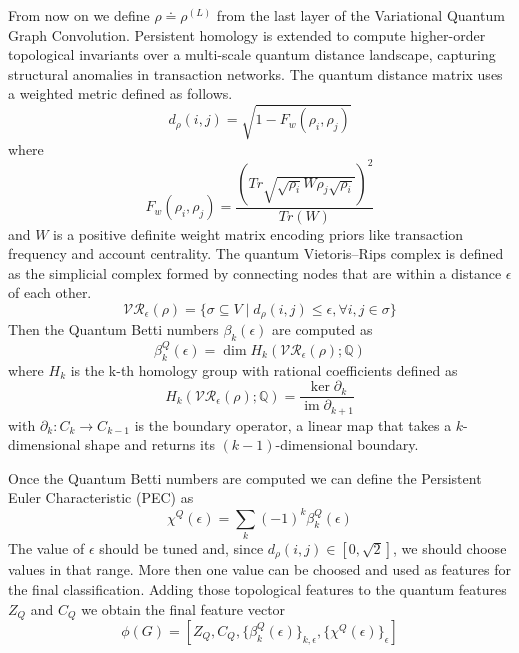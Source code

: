 From now on we define \(\rho \doteq \rho^{(L)}\) from the last layer of the Variational Quantum Graph Convolution. Persistent homology is extended to compute higher-order topological invariants over a multi-scale quantum distance landscape, capturing structural anomalies in transaction networks. The quantum distance matrix uses a weighted metric defined as follows.
\begin{equation}
    d_{\rho}(i,j)=\sqrt{1-F_{w}(\rho_{i},\rho_{j})}
\end{equation}
where
\begin{equation}
    F_{w}(\rho_{i},\rho_{j})=\frac{(Tr\sqrt{\sqrt{\rho_{i}}W\rho_{j}\sqrt{\rho_{i}}})^{2}}{Tr(W)}
\end{equation}
and \(W\) is a positive definite weight matrix encoding priors like transaction frequency and account centrality.
The quantum Vietoris--Rips complex is defined as the simplicial complex formed by connecting nodes that are within a distance $\epsilon$ of each other.
\begin{equation}
    \mathcal{VR}_{\epsilon}(\rho)=\{\sigma\subseteq V \mid d_{\rho}(i,j)\le\epsilon,\forall i,j\in\sigma\}
\end{equation}
Then the Quantum Betti numbers \(\beta_k(\epsilon)\) are computed as
\begin{equation}
    \beta_{k}^{Q}(\epsilon)=\dim H_{k}(\mathcal{V}\mathcal{R}_{\epsilon}(\rho);\mathbb{Q})
\end{equation}
where \(H_k\) is the k-th homology group with rational coefficients defined as
\begin{equation}
    H_{k}(\mathcal{VR}_{\epsilon}(\rho);\mathbb{Q})=\frac{\ker \partial_{k}}{\operatorname{im} \partial_{k+1}}
\end{equation}
with \(\partial_k : C_k \to C_{k-1}\) is the boundary operator, a linear map that takes a $k$-dimensional shape and returns its $(k-1)$-dimensional boundary.

Once the Quantum Betti numbers are computed we can define the Persistent Euler Characteristic (PEC) as
\begin{equation}
    \chi^{Q}(\epsilon)=\sum_{k}(-1)^{k}\beta_{k}^{Q}(\epsilon)
\end{equation}
The value of \(\epsilon\) should be tuned and, since \(d_\rho(i,j) \in [0,\sqrt{2}]\), we should choose values in that range. More then one value can be choosed and used as features for the final classification.
Adding those topological features to the quantum features \(Z_Q\) and \(C_Q\) we obtain the final feature vector
\begin{equation}
    \phi(G)=[Z_{Q},C_{Q},\{\beta_{k}^{Q}(\epsilon)\}_{k,\epsilon},\{\chi^{Q}(\epsilon)\}_{\epsilon}]
\end{equation}
